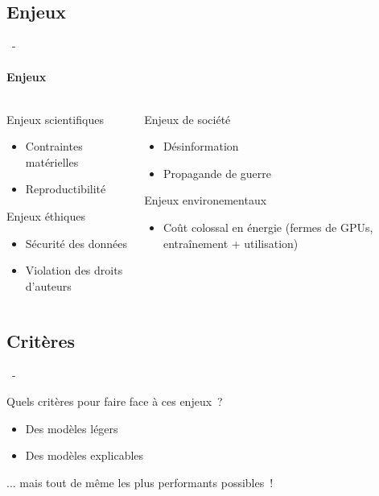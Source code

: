\documentclass[aspectratio=169, 22pt]{beamer}
\begin{document}
\subsection{Enjeux}
\begin{frame}{\secname~- \subsecname}
  \framesubtitle{Enjeux}
  \begin{columns}
    \begin{column}{0.5\linewidth}
      \pause
      \begin{customblock}{Enjeux scientifiques}
        \begin{itemize}
        \item Contraintes matérielles
        \item Reproductibilité
        \end{itemize}
      \end{customblock}
      \pause
      \begin{block}{Enjeux éthiques}
        \begin{itemize}
        \item Sécurité des données
        \item Violation des droits d'auteurs
        \end{itemize}
      \end{block}
    \end{column}
    \begin{column}{0.5\linewidth}
      \pause
      \begin{alertblock}{Enjeux de société}
        \begin{itemize}
        \item Désinformation
        \item Propagande de guerre
        \end{itemize}
      \end{alertblock}
      \pause
      \begin{exampleblock}{Enjeux environementaux}
        \begin{itemize}
        \item Coût colossal en énergie (fermes de GPUs, entraînement + utilisation)
        \end{itemize}
      \end{exampleblock}
    \end{column}
  \end{columns}
\end{frame}

\subsection{Critères}
\begin{frame}{\secname~- \subsecname}
  \begin{exampleblock}{\centering Quels critères pour faire face à ces enjeux ?}
    \begin{itemize}
      \pause
    \item Des modèles \alert{légers}
      \pause
    \item Des modèles \alert{explicables}
    \end{itemize}
    \pause
    ... mais tout de même les plus performants possibles~!
  \end{exampleblock}
\end{frame}
\end{document}
